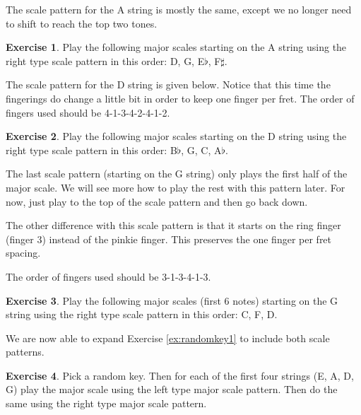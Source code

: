 \documentclass[12pt]{article}
\theoremstyle{definition}
\newtheorem{exercise}{Exercise}
\begin{document}
The scale pattern for the A string is mostly the same, except we no longer need to shift to reach the top two tones. 

\begin{exercise}
Play the following major scales starting on the A string using the right type scale pattern in this order: D, G, E$\flat$, F$\sharp$.
\end{exercise}

The scale pattern for the D string is given below.
Notice that this time the fingerings do change a little bit in order to keep one finger per fret. The order of fingers used should be 4-1-3-4-2-4-1-2. 

\begin{exercise}
Play the following major scales starting on the D string using the right type scale pattern in this order: B$\flat$, G, C, A$\flat$.
\end{exercise}

The last scale pattern (starting on the G string) only plays the first half of the major scale. We will see more how to play the rest with this pattern later. For now, just play to the top of the scale pattern and then go back down. 

The other difference with this scale pattern is that it starts on the ring finger (finger 3) instead of the pinkie finger. This preserves the one finger per fret spacing. 


The order of fingers used should be 3-1-3-4-1-3. 

\begin{exercise}
Play the following major scales (first 6 notes) starting on the G string using the right type scale pattern in this order: C, F, D.
\end{exercise}

We are now able to expand Exercise \ref{ex:randomkey1} to include both scale patterns. 

\begin{exercise} \label{ex:randomkey2}
Pick a random key. Then for each of the first four strings (E, A, D, G) play the major scale using the left type major scale pattern. Then do the same using the right type major scale pattern. 
\end{exercise}
\end{document}
